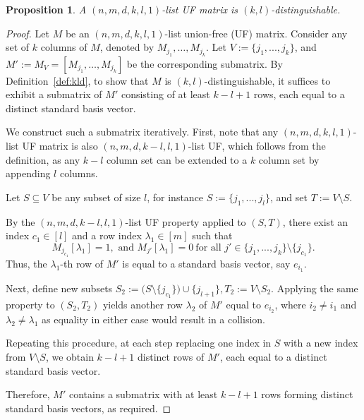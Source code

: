 \documentclass[10pt,a4paper]{amsart}
\newtheorem{proposition}{Proposition}
\begin{document}
\begin{proposition}\label{prop2.1.1}
    A $(n,m,d,k,l, 1)$-list UF matrix is $(k,l)$-distinguishable.
\end{proposition}

\begin{proof}
    Let $M$ be an $(n,m,d,k,l,1)$-list union-free (UF) matrix. Consider any set of $k$ columns of $M$, denoted by $M_{j_1}, \dots, M_{j_k}$. Let $V:=\{j_1,...,j_k\}$, and
\(
M' := M_{V} = [M_{j_1}, \dots, M_{j_k}]
\)
be the corresponding submatrix. 
By Definition~\ref{def:kld}, to show that $M$ is $(k,l)$-distinguishable, it suffices to exhibit a submatrix of $M'$ consisting of at least $k - l + 1$ rows, each equal to a distinct standard basis vector.

We construct such a submatrix iteratively. First, note that any $(n,m,d,k,l,1)$-list UF matrix is also $(n,m,d,k-l,l,1)$-list UF, which  follows from the definition, as any $k-l$ column set can be extended to a $k$ column set by appending $l$ columns.

Let $S \subseteq V$ be any subset of size $l$, for instance
\(
S := \{j_1,...,j_l\}\), and set \( T := V \setminus S.
\)

By the $(n,m,d,k-l,l,1)$-list UF property applied to $(S,T)$, there exist an index $c_1 \in [l]$ and a row index $\lambda_1 \in [m]$ such that
\[
M_{j_{c_1}}[\lambda_1] = 1, \text{ and } M_{j'}[\lambda_1] = 0 \ \text{for all } j'\in \{j_1,...,j_k\} \setminus \{j_{c_1}\}.
\]
Thus, the $\lambda_1$-th row of $M'$ is equal to a standard basis vector, say $e_{i_1}$.

Next, define new subsets
\(
S_2 := \bigl(S \setminus \{j_{c_1}\}\bigr) \cup \{j_{l+1}\},  T_2 := V \setminus S_2.
\)
Applying the same property to $(S_2, T_2)$ yields another row $\lambda_2$ of $M'$ equal to $e_{i_2}$, where $i_2 \neq i_1$ and $\lambda_2\neq \lambda_1$ as equality in either case would result in a collision.

Repeating this procedure, at each step replacing one index in $S$ with a new index from $V \setminus S$, we obtain $k - l + 1$ distinct rows of $M'$, each equal to a distinct standard basis vector.

Therefore, $M'$ contains a submatrix with at least $k - l + 1$ rows forming distinct standard basis vectors, as required.
\end{proof}
\end{document}
